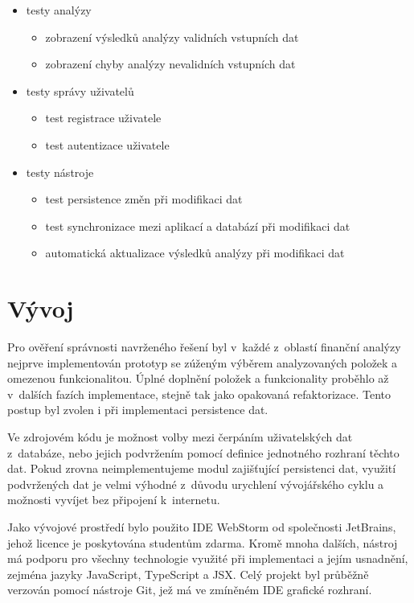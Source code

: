 \begin{itemize}
  \item testy analýzy
  \begin{itemize}
    \item zobrazení výsledků analýzy validních vstupních dat
    \item zobrazení chyby analýzy nevalidních vstupních dat
  \end{itemize}
  \item testy správy uživatelů
  \begin{itemize}
    \item{test registrace uživatele}
    \item{test autentizace uživatele}
  \end{itemize} 
  \item testy nástroje
  \begin{itemize}
    \item{test persistence změn při modifikaci dat}
    \item{test synchronizace mezi aplikací a databází při modifikaci dat}
    \item{automatická aktualizace výsledků analýzy při modifikaci dat}
  \end{itemize}
\end{itemize}


\section{Vývoj}
Pro ověření správnosti navrženého řešení byl v~každé z~oblastí finanční analýzy nejprve implementován prototyp se zúženým výběrem analyzovaných položek a omezenou funkcionalitou. Úplné doplnění položek a funkcionality proběhlo až v~dalších fazích implementace, stejně tak jako opakovaná refaktorizace. Tento postup byl zvolen i při implementaci persistence dat. 

Ve zdrojovém kódu je možnost volby mezi čerpáním uživatelských dat z~databáze, nebo jejich podvržením pomocí definice jednotného rozhraní těchto dat. Pokud zrovna neimplementujeme modul zajišťující persistenci dat, využití podvržených dat je velmi výhodné z~důvodu urychlení vývojářského cyklu a možnosti vyvíjet bez připojení k~internetu.

Jako vývojové prostředí bylo použito IDE WebStorm od společnosti JetBrains, jehož licence je poskytována studentům zdarma. Kromě mnoha dalších, nástroj má podporu pro všechny technologie využité při implementaci a jejím usnadnění, zejména jazyky JavaScript, TypeScript a JSX. Celý projekt byl průběžně verzován pomocí nástroje Git, jež má ve zmíněném IDE grafické rozhraní.

